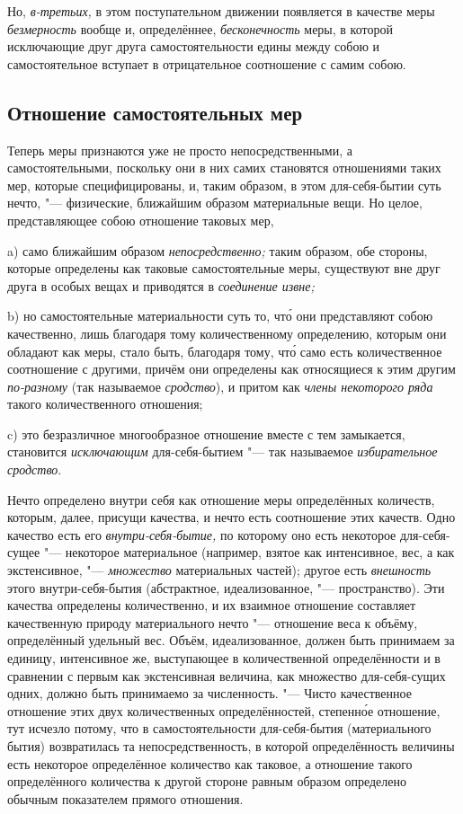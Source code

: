 Но, {\em в-третьих,} в этом поступательном движении появляется в качестве меры
{\em безмерность} вообще и, определённее, {\em бесконечность} меры, в которой
исключающие друг друга самостоятельности едины между собою и самостоятельное
вступает в отрицательное соотношение с самим собою.

\subsection{Отношение самостоятельных мер}

Теперь меры признаются уже не просто непосредственными, а самостоятельными,
поскольку они в них самих становятся отношениями таких мер, которые
специфицированы, и, таким образом, в этом для-себя-бытии суть нечто, "---
физические, ближайшим образом материальные вещи. Но целое, представляющее
собою отношение таковых мер,

a) само ближайшим образом {\em непосредственно;} таким образом, обе стороны,
которые определены как таковые самостоятельные меры, существуют вне друг друга
в особых вещах и приводятся в {\em соединение извне;}

b) но самостоятельные материальности суть то, чт\'{о} они представляют собою
качественно, лишь благодаря тому количественному определению, которым они
обладают как меры, стало быть, благодаря тому, чт\'{о} само есть количественное
соотношение с другими, причём они определены как относящиеся к этим другим
{\em по-разному} (так называемое {\em сродство}), и притом как
{\em члены некоторого ряда} такого количественного отношения;

c) это безразличное многообразное отношение вместе с тем замыкается,
становится {\em исключающим} для-себя-бытием "--- так называемое
{\em избирательное сродство}.


Нечто определено внутри себя как отношение меры определённых количеств,
которым, далее, присущи качества, и нечто есть соотношение этих качеств. Одно
качество есть его {\em внутри-себя-бытие,} по которому оно есть некоторое
для-себя-сущее "--- некоторое материальное (например, взятое как интенсивное,
вес, а как экстенсивное, "--- {\em множество} материальных частей); другое есть
{\em внешность} этого внутри-себя-бытия (абстрактное, идеализованное, "---
пространство). Эти качества определены количественно, и их взаимное отношение
составляет качественную природу материального нечто "--- отношение веса к
объёму, определённый удельный вес. Объём, идеализованное, должен быть
принимаем за единицу, интенсивное же, выступающее в количественной
определённости и в сравнении с первым как экстенсивная величина, как множество
для-себя-сущих одних, должно быть принимаемо за численность. "--- Чисто
качественное отношение этих двух количественных определённостей, степенн\'{о}е
отношение, тут исчезло потому, что в самостоятельности для-себя-бытия
(материального бытия) возвратилась та непосредственность, в которой
определённость величины есть некоторое определённое количество как таковое, а
отношение такого определённого количества к другой стороне равным образом
определено обычным показателем прямого отношения.

